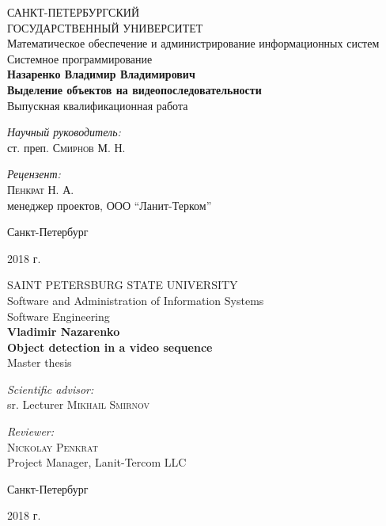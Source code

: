 \documentclass[aps,%
14pt,%
final,%
oneside,
onecolumn,%
musixtex, %
superscriptaddress,%
centertags]{extarticle} %
\begin{document}
\begin{titlepage} 
\begin{center}
{\large САНКТ-ПЕТЕРБУРГСКИЙ \\ ГОСУДАРСТВЕННЫЙ УНИВЕРСИТЕТ} \\[1.0cm]
{\large Математическое обеспечение и администрирование информационных систем} \\[0.2cm]
{\large Системное программирование} \\[3.5cm]
 
\textbf{\Large Назаренко Владимир Владимирович} \\[1cm]
\textbf{\LARGE Выделение объектов на видеопоследовательности}\\[1.0cm]
{\Large Выпускная квалификационная работа} \\[3.5cm]

\begin{flushright} \large
\emph{Научный руководитель:} \\
ст. преп. \textsc{Смирнов М. Н.}
\end{flushright}
 \begin{flushright} \large
\emph{Рецензент:} \\
\textsc{Пенкрат Н. А.} \\
менеджер проектов, ООО ``Ланит-Терком''
\end{flushright}
\vfill 

{\large {Санкт-Петербург}} \par
{\large {2018 г.}}
\end{center} 
\end{titlepage}

\begin{titlepage} 
\begin{center}
{\large SAINT PETERSBURG STATE UNIVERSITY} \\[1.0cm]
{\large Software and Administration of Information Systems} \\[0.2cm]
{\large Software Engineering} \\[3.5cm]
 
\textbf{\Large Vladimir Nazarenko} \\[1cm]
\textbf{\LARGE Object detection in a video sequence}\\[1.0cm]
{\Large Master thesis} \\[3.5cm]

\begin{flushright} \large
\emph{Scientific advisor:} \\
sr. Lecturer \textsc{Mikhail Smirnov}
\end{flushright}
 \begin{flushright} \large
\emph{Reviewer:} \\
\textsc{Nickolay Penkrat} \\
Project Manager, Lanit-Tercom LLC
\end{flushright}
\vfill 

{\large {Санкт-Петербург}} \par
{\large {2018 г.}}
\end{center} 
\end{titlepage}
\end{document}
